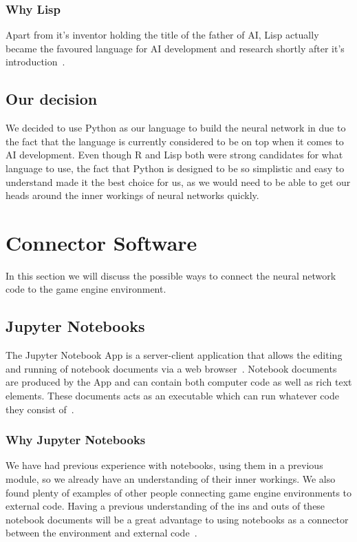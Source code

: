 \subsubsection{Why Lisp}
Apart from it's inventor holding the title of the father of AI, Lisp actually became the favoured language for AI development and research shortly after it's introduction~\cite{LISPTut}.

\subsection{Our decision}
We decided to use Python as our language to build the neural network in due to the fact that the language is currently considered to be on top when it comes to AI development. Even though R and Lisp both were strong candidates for what language to use, the fact that Python is designed to be so simplistic and easy to understand made it the best choice for us, as we would need to be able to get our heads around the inner workings of neural networks quickly.

\section{Connector Software}
In this section we will discuss the possible ways to connect the neural network code to the game engine environment.

\subsection{Jupyter Notebooks}
The Jupyter Notebook App is a server-client application that allows the editing and running of notebook documents via a web browser~\cite{jupyterSite}. Notebook documents are produced by the App and can contain both computer code as well as rich text elements. These documents acts as an executable which can run whatever code they consist of~\cite{jupyterDocs}.

\subsubsection{Why Jupyter Notebooks}
We have had previous experience with notebooks, using them in a previous module, so we already have an understanding of their inner workings. We also found plenty of examples of other people connecting game engine environments to  external code. Having a previous understanding of the ins and outs of these notebook documents will be a great advantage to using notebooks as a connector between the environment and external code~\cite{MikeDriscoll}.

